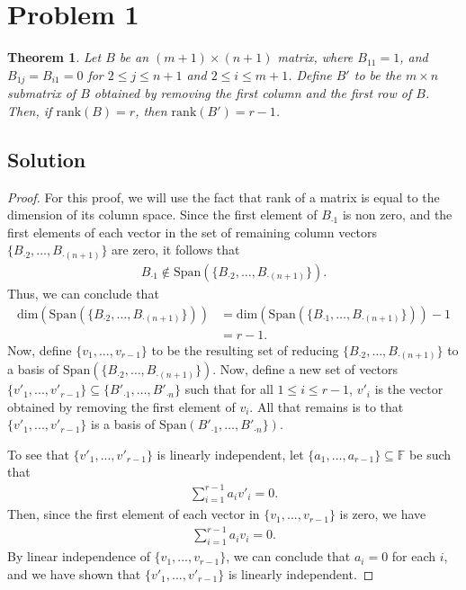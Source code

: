 \documentclass[10pt,a4paper]{article}
\author{Jeremiah Givens}
\newtheorem{theorem}{Theorem}
\theoremstyle{definition}
\begin{document}
\section*{Problem 1}
\begin{theorem}
Let $B$ be an $(m + 1) \times (n + 1)$ matrix, where $B_{11} = 1$, and $B_{1j} = B_{i1} = 0$ for $2 \leq j \leq n + 1$ and $2 \leq i \leq m + 1$. Define $B'$ to be the $m \times n$ submatrix of $B$ obtained by removing the first column and the first row of $B$. Then, if $\text{rank}(B) = r$, then $\text{rank}(B') = r - 1$.
\end{theorem}

\subsection*{Solution}
\begin{proof}
For this proof, we will use the fact that rank of a matrix is equal to the dimension of its column space. Since the first element of $B_{\cdot 1}$ is non zero, and the first elements of each vector in the set of remaining column vectors $\{B_{\cdot 2}, \dots, B_{\cdot (n + 1)} \}$ are zero, it follows that 
\begin{align*}
B_{\cdot 1} \not \in \text{Span}\left( \{B_{\cdot 2}, \dots, B_{\cdot (n + 1)} \} \right).
\end{align*}
Thus, we can conclude that 
\begin{align*}
\text{dim} \left( \text{Span}\left( \{B_{\cdot 2}, \dots, B_{\cdot (n + 1)} \} \right) \right) &= \text{dim} \left( \text{Span}\left( \{B_{\cdot 1}, \dots, B_{\cdot (n + 1)} \} \right) \right) - 1\\
&= r - 1.
\end{align*}
Now, define $\{v_1, ..., v_{r - 1} \}$ to be the resulting set of reducing  $\{B_{\cdot 2}, \dots, B_{\cdot (n + 1)} \}$ to a basis of $\text{Span}\left( \{B_{\cdot 2}, \dots, B_{\cdot (n + 1)} \} \right)$. Now, define a new set of vectors $\{v'_1, ..., v'_{r - 1} \} \subseteq \{ B'_{\cdot 1}, \dots, B'_{\cdot n} \}$ such that for all $1 \leq i \leq r - 1$, $v'_i$ is the vector obtained by removing the first element of $v_i$. All that remains is to that $\{v'_1, ..., v'_{r - 1} \}$ is a basis of $\text{Span}\left( B'_{\cdot 1}, \dots, B'_{\cdot n} \} \right)$.

To see that $\{v'_1, ..., v'_{r - 1} \}$ is linearly independent, let $\{a_1, \dots, a_{r-1} \} \subseteq \mathbb{F}$ be such that 
\begin{align*}
\sum_{i = 1}^{r-1} a_i v'_i = 0.
\end{align*}
Then, since the first element of each vector in $\{v_1, ..., v_{r - 1} \}$ is zero, we have
\begin{align*}
\sum_{i = 1}^{r-1} a_i v_i = 0.
\end{align*}
By linear independence of $\{v_1, ..., v_{r - 1} \}$, we can conclude that $a_i = 0$ for each $i$, and we have shown that $\{v'_1, ..., v'_{r - 1} \}$ is linearly independent.


\end{proof}
\end{document}
